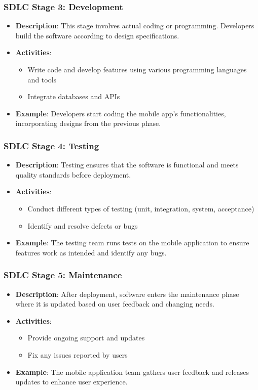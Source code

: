 \documentclass{beamer}
\begin{document}
\begin{frame}[fragile]
    \frametitle{SDLC Stage 3: Development}
    \begin{itemize}
        \item \textbf{Description}: This stage involves actual coding or programming. Developers build the software according to design specifications.
        \item \textbf{Activities}:
        \begin{itemize}
            \item Write code and develop features using various programming languages and tools
            \item Integrate databases and APIs
        \end{itemize}
        \item \textbf{Example}: Developers start coding the mobile app's functionalities, incorporating designs from the previous phase.
    \end{itemize}
\end{frame}

\begin{frame}[fragile]
    \frametitle{SDLC Stage 4: Testing}
    \begin{itemize}
        \item \textbf{Description}: Testing ensures that the software is functional and meets quality standards before deployment.
        \item \textbf{Activities}:
        \begin{itemize}
            \item Conduct different types of testing (unit, integration, system, acceptance)
            \item Identify and resolve defects or bugs
        \end{itemize}
        \item \textbf{Example}: The testing team runs tests on the mobile application to ensure features work as intended and identify any bugs.
    \end{itemize}
\end{frame}

\begin{frame}[fragile]
    \frametitle{SDLC Stage 5: Maintenance}
    \begin{itemize}
        \item \textbf{Description}: After deployment, software enters the maintenance phase where it is updated based on user feedback and changing needs.
        \item \textbf{Activities}:
        \begin{itemize}
            \item Provide ongoing support and updates
            \item Fix any issues reported by users
        \end{itemize}
        \item \textbf{Example}: The mobile application team gathers user feedback and releases updates to enhance user experience.
    \end{itemize}
\end{frame}
\end{document}
